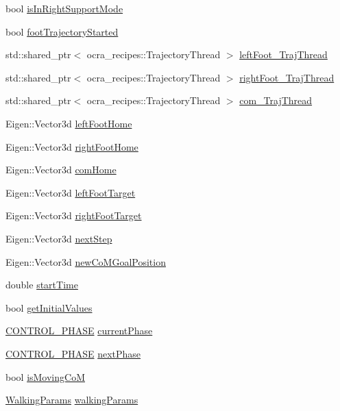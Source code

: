 \begin{DoxyCompactItemize}
\item 
bool \hyperlink{classSteppingDemoClient_a7697070e5db6c635aa2eff70bce29176}{is\+In\+Right\+Support\+Mode}
\item 
bool \hyperlink{classSteppingDemoClient_a6036e2d0b604648ca39e4d64b41a9d6e}{foot\+Trajectory\+Started}
\item 
std\+::shared\+\_\+ptr$<$ ocra\+\_\+recipes\+::\+Trajectory\+Thread $>$ \hyperlink{classSteppingDemoClient_afd18627088c2c12f172ff9e976da5330}{left\+Foot\+\_\+\+Traj\+Thread}
\item 
std\+::shared\+\_\+ptr$<$ ocra\+\_\+recipes\+::\+Trajectory\+Thread $>$ \hyperlink{classSteppingDemoClient_a8b4b931d41b47d9923417506fac107f3}{right\+Foot\+\_\+\+Traj\+Thread}
\item 
std\+::shared\+\_\+ptr$<$ ocra\+\_\+recipes\+::\+Trajectory\+Thread $>$ \hyperlink{classSteppingDemoClient_a9f3d1cdc49cc26a10f9b8fb0d0c68cab}{com\+\_\+\+Traj\+Thread}
\item 
Eigen\+::\+Vector3d \hyperlink{classSteppingDemoClient_acd4cb9dbe053979701574f5d1d4ef349}{left\+Foot\+Home}
\item 
Eigen\+::\+Vector3d \hyperlink{classSteppingDemoClient_ae2a3bdaafc7784b5afece8ae9ebaff7d}{right\+Foot\+Home}
\item 
Eigen\+::\+Vector3d \hyperlink{classSteppingDemoClient_aa018c1f2734d63f962be512461c9e010}{com\+Home}
\item 
Eigen\+::\+Vector3d \hyperlink{classSteppingDemoClient_a2360933e2902d1b1a374787bd67e14e7}{left\+Foot\+Target}
\item 
Eigen\+::\+Vector3d \hyperlink{classSteppingDemoClient_abfe6635a0ad50fa4baa6fa10b8c56d9e}{right\+Foot\+Target}
\item 
Eigen\+::\+Vector3d \hyperlink{classSteppingDemoClient_af9e0358390f12ed0135275b20bf1f6f5}{next\+Step}
\item 
Eigen\+::\+Vector3d \hyperlink{classSteppingDemoClient_ab4a77111abbf3630280a64d17ac59eef}{new\+Co\+M\+Goal\+Position}
\item 
double \hyperlink{classSteppingDemoClient_af7b6e48319ef9d35fb975edc3bb2a137}{start\+Time}
\item 
bool \hyperlink{classSteppingDemoClient_aedd8bb5bca60afbdd2b8de3b5d1829d7}{get\+Initial\+Values}
\item 
\hyperlink{SteppingDemoClient_8h_af2a8507bf21c3ce9b0e67a23381251c6}{C\+O\+N\+T\+R\+O\+L\+\_\+\+P\+H\+A\+SE} \hyperlink{classSteppingDemoClient_afe0aa2a02ea8117d644bf5444a03ac62}{current\+Phase}
\item 
\hyperlink{SteppingDemoClient_8h_af2a8507bf21c3ce9b0e67a23381251c6}{C\+O\+N\+T\+R\+O\+L\+\_\+\+P\+H\+A\+SE} \hyperlink{classSteppingDemoClient_ab5a3b82049a9786162a60d0ae94f96d9}{next\+Phase}
\item 
bool \hyperlink{classSteppingDemoClient_ad7e3950d053af7c1aca33b3e7c3b20c5}{is\+Moving\+CoM}
\item 
\hyperlink{structWalkingParams}{Walking\+Params} \hyperlink{classSteppingDemoClient_a113c2d838e3db1d18f4843a8828e30d4}{walking\+Params}
\end{DoxyCompactItemize}


